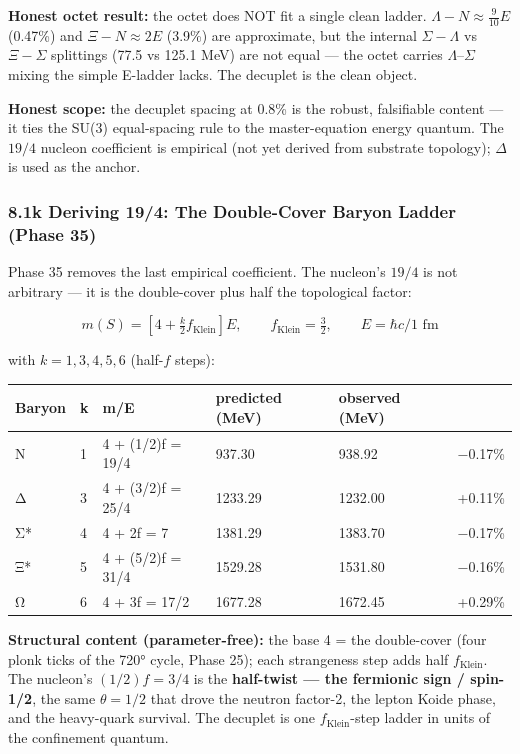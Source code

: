 \documentclass[
]{article}
\begin{document}
\textbf{Honest octet result:} the octet does NOT fit a single clean
ladder. \(\Lambda - N \approx \tfrac{9}{10}E\) (0.47\%) and
\(\Xi - N \approx 2E\) (3.9\%) are approximate, but the internal
\(\Sigma-\Lambda\) vs \(\Xi-\Sigma\) splittings (77.5 vs 125.1 MeV) are
not equal --- the octet carries \(\Lambda\)--\(\Sigma\) mixing the
simple E-ladder lacks. The decuplet is the clean object.

\textbf{Honest scope:} the decuplet spacing at 0.8\% is the robust,
falsifiable content --- it ties the SU(3) equal-spacing rule to the
master-equation energy quantum. The \(19/4\) nucleon coefficient is
empirical (not yet derived from substrate topology); \(\Delta\) is used
as the anchor.

\subsubsection{8.1k Deriving 19/4: The Double-Cover Baryon Ladder (Phase
35)}\label{k-deriving-194-the-double-cover-baryon-ladder-phase-35}

Phase 35 removes the last empirical coefficient. The nucleon's \(19/4\)
is not arbitrary --- it is the double-cover plus half the topological
factor:

\[m(S) = \left[4 + \tfrac{k}{2}f_{\text{Klein}}\right]E, \qquad f_{\text{Klein}} = \tfrac{3}{2}, \qquad E = \hbar c/1\text{ fm}\]

with \(k = 1, 3, 4, 5, 6\) (half-\(f\) steps):

\begin{longtable}[]{@{}llllll@{}}
\toprule\noalign{}
Baryon & k & m/E & predicted (MeV) & observed (MeV) & \\
\midrule\noalign{}
\endhead
\bottomrule\noalign{}
\endlastfoot
N & 1 & 4 + (1/2)f = 19/4 & 937.30 & 938.92 & −0.17\% \\
Δ & 3 & 4 + (3/2)f = 25/4 & 1233.29 & 1232.00 & +0.11\% \\
Σ* & 4 & 4 + 2f = 7 & 1381.29 & 1383.70 & −0.17\% \\
Ξ* & 5 & 4 + (5/2)f = 31/4 & 1529.28 & 1531.80 & −0.16\% \\
Ω & 6 & 4 + 3f = 17/2 & 1677.28 & 1672.45 & +0.29\% \\
\end{longtable}

\textbf{Structural content (parameter-free):} the base 4 = the
double-cover (four plonk ticks of the 720° cycle, Phase 25); each
strangeness step adds half \(f_{\text{Klein}}\). The nucleon's
\((1/2)f = 3/4\) is the \textbf{half-twist --- the fermionic sign /
spin-1/2}, the same \(\theta = 1/2\) that drove the neutron factor-2,
the lepton Koide phase, and the heavy-quark survival. The decuplet is
one \(f_{\text{Klein}}\)-step ladder in units of the confinement
quantum.
\end{document}

